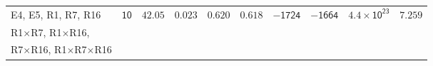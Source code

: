 \begin{table}[ht]
\begin{adjustbox}{width=\textwidth}
\begin{tabular}{llllllllll}
\\

E4, E5, R1, R7, R16 & \multirow{3}{*}{$\mathsf{10}$} & \multirow{3}{*}{$\mathsf{42.05}$} & \multirow{3}{*}{$\mathsf{0.023}$} & \multirow{3}{*}{$\mathsf{0.620}$} & \multirow{3}{*}{$\mathsf{0.618}$} & \multirow{3}{*}{$\mathsf{-1724}$} & \multirow{3}{*}{$\mathsf{-1664}$} & \multirow{3}{*}{$\mathsf{4.4\times10^{23}}$} & \multirow{3}{*}{$\mathsf{7.259}$} \\
R1$\times$R7, R1$\times$R16, &  &  &  &  &  &  &  &  & \\
R7$\times$R16, R1$\times$R7$\times$R16 &  &  &  &  &  &  &  &  & \\
  \hline
\end{tabular}
\end{adjustbox}
\endgroup
\footnotesize
\end{table}